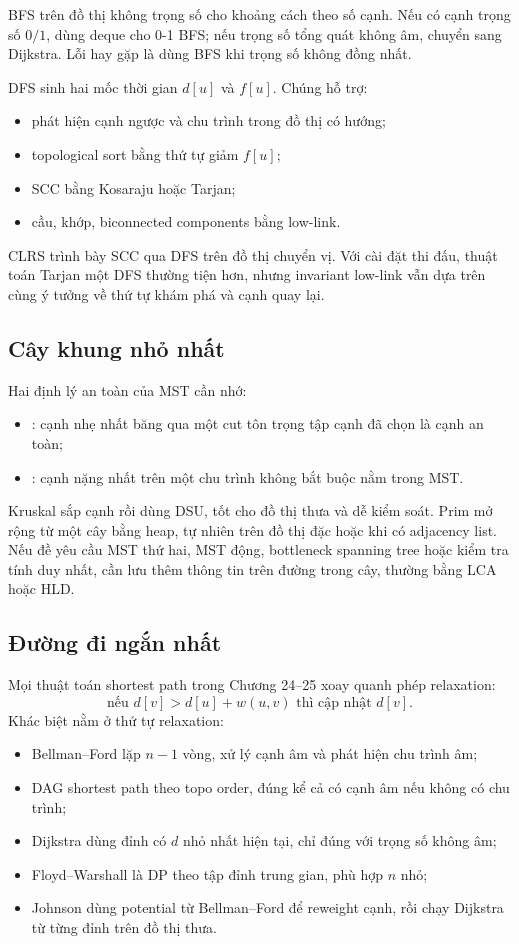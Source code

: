 \documentclass[11pt]{article}
\begin{document}
BFS trên đồ thị không trọng số cho khoảng cách theo số cạnh. Nếu có cạnh trọng
số \(0/1\), dùng deque cho 0-1 BFS; nếu trọng số tổng quát không âm, chuyển sang
Dijkstra. Lỗi hay gặp là dùng BFS khi trọng số không đồng nhất.

DFS sinh hai mốc thời gian \(d[u]\) và \(f[u]\). Chúng hỗ trợ:
\begin{itemize}
  \item phát hiện cạnh ngược và chu trình trong đồ thị có hướng;
  \item topological sort bằng thứ tự giảm \(f[u]\);
  \item SCC bằng Kosaraju hoặc Tarjan;
  \item cầu, khớp, biconnected components bằng low-link.
\end{itemize}
CLRS trình bày SCC qua DFS trên đồ thị chuyển vị. Với cài đặt thi đấu, thuật
toán Tarjan một DFS thường tiện hơn, nhưng invariant low-link vẫn dựa trên cùng
ý tưởng về thứ tự khám phá và cạnh quay lại.

\subsection{Cây khung nhỏ nhất}

Hai định lý an toàn của MST cần nhớ:
\begin{itemize}
  \item {}: cạnh nhẹ nhất băng qua một cut tôn trọng tập cạnh
        đã chọn là cạnh an toàn;
  \item {}: cạnh nặng nhất trên một chu trình không bắt buộc
        nằm trong MST.
\end{itemize}

Kruskal sắp cạnh rồi dùng DSU, tốt cho đồ thị thưa và dễ kiểm soát. Prim mở rộng
từ một cây bằng heap, tự nhiên trên đồ thị đặc hoặc khi có adjacency list. Nếu
đề yêu cầu MST thứ hai, MST động, bottleneck spanning tree hoặc kiểm tra tính
duy nhất, cần lưu thêm thông tin trên đường trong cây, thường bằng LCA hoặc HLD.

\subsection{Đường đi ngắn nhất}

Mọi thuật toán shortest path trong Chương 24--25 xoay quanh phép relaxation:
\[
  \text{nếu } d[v]>d[u]+w(u,v) \text{ thì cập nhật } d[v].
\]
Khác biệt nằm ở thứ tự relaxation:
\begin{itemize}
  \item Bellman--Ford lặp \(n-1\) vòng, xử lý cạnh âm và phát hiện chu trình âm;
  \item DAG shortest path theo topo order, đúng kể cả có cạnh âm nếu không có
        chu trình;
  \item Dijkstra dùng đỉnh có \(d\) nhỏ nhất hiện tại, chỉ đúng với trọng số
        không âm;
  \item Floyd--Warshall là DP theo tập đỉnh trung gian, phù hợp \(n\) nhỏ;
  \item Johnson dùng potential từ Bellman--Ford để reweight cạnh, rồi chạy
        Dijkstra từ từng đỉnh trên đồ thị thưa.
\end{itemize}
\end{document}

